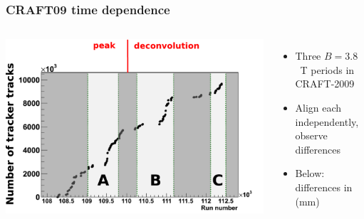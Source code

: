 \documentclass[compress]{beamer}
\begin{document}
\begin{frame}
\frametitle{CRAFT09 time dependence}
\begin{columns}
\includegraphics[width=\linewidth]{bfield_regions.pdf}
\begin{itemize}
\item Three $B=3.8$~T periods in CRAFT-2009
\item Align each independently, observe differences
\item Below: differences in  (mm)

\end{itemize}
\end{columns}


\end{frame}
\end{document}
